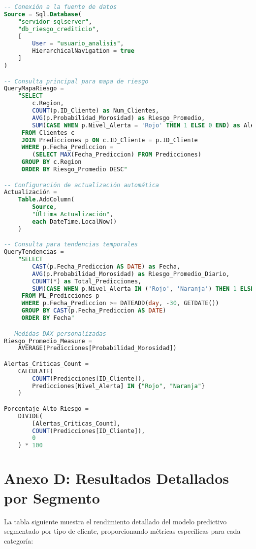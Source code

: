 \begin{lstlisting}[language=SQL, caption=Configuración de Power BI para dashboard de riesgo crediticio]
-- Conexión a la fuente de datos
Source = Sql.Database(
    "servidor-sqlserver", 
    "db_riesgo_crediticio",
    [
        User = "usuario_analisis",
        HierarchicalNavigation = true
    ]
)

-- Consulta principal para mapa de riesgo
QueryMapaRiesgo = 
    "SELECT 
        c.Region, 
        COUNT(p.ID_Cliente) as Num_Clientes,
        AVG(p.Probabilidad_Morosidad) as Riesgo_Promedio,
        SUM(CASE WHEN p.Nivel_Alerta = 'Rojo' THEN 1 ELSE 0 END) as Alertas_Rojas
     FROM Clientes c
     JOIN Predicciones p ON c.ID_Cliente = p.ID_Cliente
     WHERE p.Fecha_Prediccion = 
        (SELECT MAX(Fecha_Prediccion) FROM Predicciones)
     GROUP BY c.Region
     ORDER BY Riesgo_Promedio DESC"

-- Configuración de actualización automática
Actualización = 
    Table.AddColumn(
        Source, 
        "Última Actualización", 
        each DateTime.LocalNow()
    )

-- Consulta para tendencias temporales
QueryTendencias = 
    "SELECT 
        CAST(p.Fecha_Prediccion AS DATE) as Fecha,
        AVG(p.Probabilidad_Morosidad) as Riesgo_Promedio_Diario,
        COUNT(*) as Total_Predicciones,
        SUM(CASE WHEN p.Nivel_Alerta IN ('Rojo', 'Naranja') THEN 1 ELSE 0 END) as Alertas_Criticas
     FROM ML_Predicciones p
     WHERE p.Fecha_Prediccion >= DATEADD(day, -30, GETDATE())
     GROUP BY CAST(p.Fecha_Prediccion AS DATE)
     ORDER BY Fecha"

-- Medidas DAX personalizadas
Riesgo_Promedio_Measure = 
    AVERAGE(Predicciones[Probabilidad_Morosidad])

Alertas_Criticas_Count = 
    CALCULATE(
        COUNT(Predicciones[ID_Cliente]),
        Predicciones[Nivel_Alerta] IN {"Rojo", "Naranja"}
    )

Porcentaje_Alto_Riesgo = 
    DIVIDE(
        [Alertas_Criticas_Count],
        COUNT(Predicciones[ID_Cliente]),
        0
    ) * 100
\end{lstlisting}
\section{Anexo D: Resultados Detallados por Segmento}

La tabla siguiente muestra el rendimiento detallado del modelo predictivo segmentado por tipo de cliente, proporcionando métricas específicas para cada categoría:

